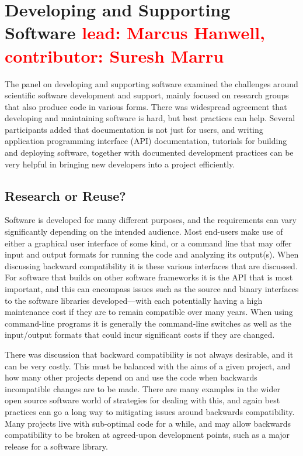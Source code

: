 \documentclass[11pt, oneside]{amsart}
\newcommand{\note}[1]{ {\textcolor{red}    { #1 }}}
\begin{document}
\section{Developing and Supporting Software \note{\scriptsize lead: Marcus Hanwell, contributor: Suresh Marru}} \label{sec:devel}

The panel on developing and supporting software examined the challenges
around scientific software development and support, mainly focused on research
groups that also produce code in various forms. There was widespread agreement
that developing and maintaining software is hard, but best practices can help.
Several participants added that documentation is not just for users, and writing
application programming interface (API) documentation, tutorials for building and deploying software, together with
documented development practices can be very helpful in bringing  new developers
into a project efficiently.

\subsection{Research or Reuse?}

Software is developed for many different purposes, and the requirements can
vary significantly depending on the intended audience. Most end-users make use
of either a graphical user interface of some kind, or a command line that may
offer input and output formats for running the code and analyzing its output(s).
When discussing backward compatibility it is these various interfaces that are
discussed. For software that builds on other software frameworks it is the
API that is most important, and this can
encompass issues such as the source and binary interfaces to the software
libraries developed---with each potentially having a high maintenance cost if
they are to remain compatible over many years. When using command-line programs
it is generally the command-line switches as well as the input/output formats
that could incur significant costs if they are changed.

There was discussion that backward compatibility is not always desirable, and it
can be very costly. This must be balanced with the aims of a given project, and how
many other projects depend on and use the code when backwards incompatible
changes are to be made. There are many examples in the wider open source
software world of strategies for dealing with this, and again best practices
can go a long way to mitigating issues around backwards compatibility. Many
projects live with sub-optimal code for a while, and may allow backwards
compatibility to be broken at agreed-upon development points, such as a major
release for a software library.
\end{document}
